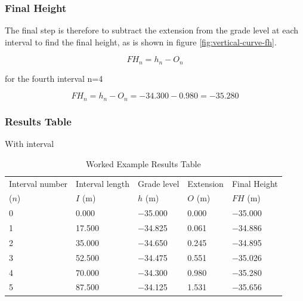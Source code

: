 \documentclass{bcrre_exam}
\begin{document}
\subsubsection*{Final Height}

The final step is therefore to subtract the extension from the grade level at each interval to find the final height, as is shown in figure \ref{fig:vertical-curve-fh}.

\begin{equation}
    FH_n=h_n - O_n
\end{equation}

for the fourth interval n=4

\begin{equation}
    FH_n=h_n - O_n = -34.300-0.980=-35.280
\end{equation}

\subsubsection*{Results Table}

With interval

\begin{table}[h]
\centering
\caption{Worked Example Results Table}
\label{tab:vc_example}
\begin{tabular}{@{}lllll@{}}
\toprule
Interval number & Interval length & Grade level & Extension & Final Height \\
($n$) & $I$ (\unit{m}) & $h$ (\unit{m}) & $O$ (\unit{m}) & $FH$ (\unit{m}) \\
\midrule
\num{0} & \num{0.000}  & \num{-35.000} & \num{0.000} & \num{-35.000} \\
\num{1} & \num{17.500} & \num{-34.825} & \num{0.061} & \num{-34.886} \\
\num{2} & \num{35.000} & \num{-34.650} & \num{0.245} & \num{-34.895} \\
\num{3} & \num{52.500} & \num{-34.475} & \num{0.551} & \num{-35.026} \\
\num{4} & \num{70.000} & \num{-34.300} & \num{0.980} & \num{-35.280} \\
\num{5} & \num{87.500} & \num{-34.125} & \num{1.531} & \num{-35.656} \\ \bottomrule
\end{tabular}
\end{table}
\end{document}
